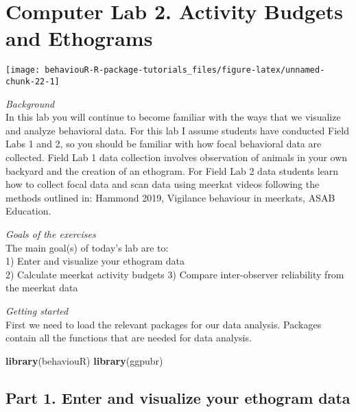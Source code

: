 \documentclass[]{book}
\newenvironment{Shaded}{\begin{snugshade}}{\end{snugshade}}
\newcommand{\KeywordTok}[1]{\textcolor[rgb]{0.13,0.29,0.53}{\textbf{#1}}}
\newcommand{\NormalTok}[1]{#1}
\begin{document}
\hypertarget{computer-lab-2.-activity-budgets-and-ethograms}{%
\chapter*{Computer Lab 2. Activity Budgets and Ethograms}\label{computer-lab-2.-activity-budgets-and-ethograms}}

\begin{center}\texttt{[image: behaviouR-R-package-tutorials\_files/figure-latex/unnamed-chunk-22-1]} \end{center}

\emph{Background}\\
In this lab you will continue to become familiar with the ways that we visualize and analyze behavioral data. For this lab I assume students have conducted Field Labs 1 and 2, so you should be familiar with how focal behavioral data are collected. Field Lab 1 data collection involves observation of animals in your own backyard and the creation of an ethogram. For Field Lab 2 data students learn how to collect focal data and scan data using meerkat videos following the methods outlined in: Hammond 2019, Vigilance behaviour in meerkats, ASAB Education.

\emph{Goals of the exercises}\\
The main goal(s) of today's lab are to:\\
1) Enter and visualize your ethogram data\\
2) Calculate meerkat activity budgets
3) Compare inter-observer reliability from the meerkat data

\emph{Getting started}\\
First we need to load the relevant packages for our data analysis. Packages contain all the functions that are needed for data analysis.

\begin{Shaded}
\begin{Highlighting}[]
\KeywordTok{library}\NormalTok{(behaviouR)}
\KeywordTok{library}\NormalTok{(ggpubr)}
\end{Highlighting}
\end{Shaded}

\hypertarget{part-1.-enter-and-visualize-your-ethogram-data}{%
\section*{Part 1. Enter and visualize your ethogram data}\label{part-1.-enter-and-visualize-your-ethogram-data}}
\end{document}
